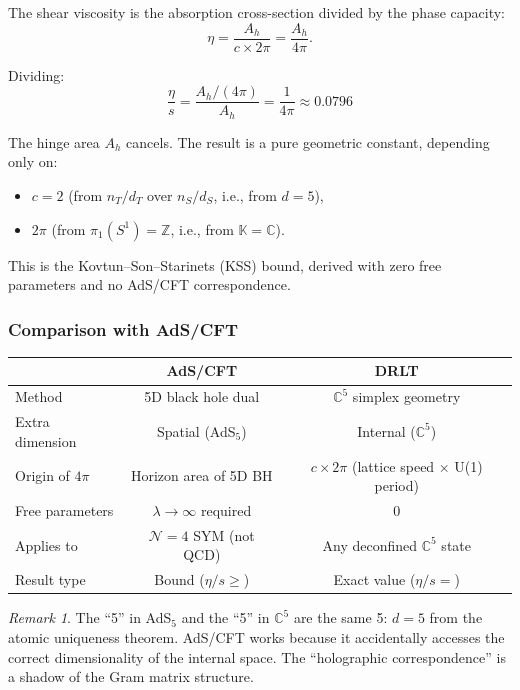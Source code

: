 \documentclass[12pt]{article}
\theoremstyle{remark}
\newtheorem{remark}[theorem]{Remark}
\theoremstyle{definition}
\newcommand{\CC}{\mathbb{C}}
\begin{document}
The shear viscosity is the absorption cross-section divided by the phase capacity:
\begin{equation}
\eta = \frac{A_h}{c \times 2\pi} = \frac{A_h}{4\pi}.
\end{equation}

Dividing:
\begin{equation}
\boxed{\frac{\eta}{s} = \frac{A_h/(4\pi)}{A_h} = \frac{1}{4\pi} \approx 0.0796}
\end{equation}

The hinge area $A_h$ cancels. The result is a pure geometric constant, depending only on:
\begin{itemize}
\item $c = 2$ (from $n_T/d_T$ over $n_S/d_S$, i.e., from $d = 5$),
\item $2\pi$ (from $\pi_1(S^1) = \mathbb{Z}$, i.e., from $\mathbb{K} = \CC$).
\end{itemize}

This is the Kovtun--Son--Starinets (KSS) bound, derived with zero free parameters and no AdS/CFT correspondence.

\subsubsection{Comparison with AdS/CFT}

\begin{center}
\begin{tabular}{lcc}
\hline
& AdS/CFT & DRLT \\
\hline
Method & 5D black hole dual & $\CC^5$ simplex geometry \\
Extra dimension & Spatial (AdS$_5$) & Internal ($\CC^5$) \\
Origin of $4\pi$ & Horizon area of 5D BH & $c \times 2\pi$ (lattice speed $\times$ U(1) period) \\
Free parameters & $\lambda \to \infty$ required & 0 \\
Applies to & $\mathcal{N} = 4$ SYM (not QCD) & Any deconfined $\CC^5$ state \\
Result type & Bound ($\eta/s \geq$) & Exact value ($\eta/s =$) \\
\hline
\end{tabular}
\end{center}

\begin{remark}
The ``5'' in AdS$_5$ and the ``5'' in $\CC^5$ are the same 5: $d = 5$ from the atomic uniqueness theorem. AdS/CFT works because it accidentally accesses the correct dimensionality of the internal space. The ``holographic correspondence'' is a shadow of the Gram matrix structure.
\end{remark}
\end{document}
